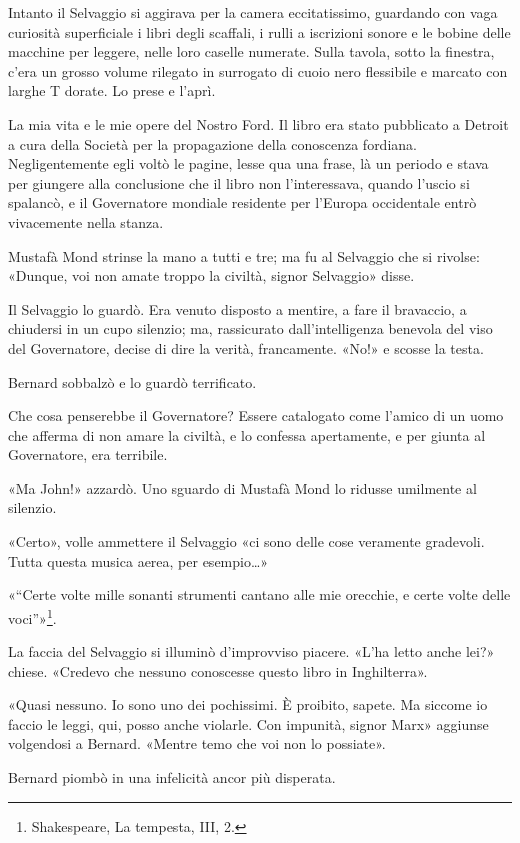 \documentclass[
a5paper, %
10pt, %
twoside, 
onecolumn, %
openany, %
]{memoir}
\begin{document}
Intanto il Selvaggio si aggirava per la camera eccitatissimo, guardando con vaga curiosità superficiale i libri degli scaffali, i rulli a iscrizioni sonore e le bobine delle macchine per leggere, nelle loro caselle numerate. Sulla tavola, sotto la finestra, c’era un grosso volume rilegato in surrogato di cuoio nero flessibile e marcato con larghe T dorate. Lo prese e l’aprì.

La mia vita e le mie opere del Nostro Ford. Il libro era stato pubblicato a Detroit a cura della Società per la propagazione della conoscenza fordiana. Negligentemente egli voltò le pagine, lesse qua una frase, là un periodo e stava per giungere alla conclusione che il libro non l’interessava, quando l’uscio si spalancò, e il Governatore mondiale residente per l’Europa occidentale entrò vivacemente nella stanza.

Mustafà Mond strinse la mano a tutti e tre; ma fu al Selvaggio che si rivolse: «Dunque, voi non amate troppo la civiltà, signor Selvaggio» disse.

Il Selvaggio lo guardò. Era venuto disposto a mentire, a fare il bravaccio, a chiudersi in un cupo silenzio; ma, rassicurato dall’intelligenza benevola del viso del Governatore, decise di dire la verità, francamente. «No!» e scosse la testa.

Bernard sobbalzò e lo guardò terrificato.

Che cosa penserebbe il Governatore? Essere catalogato come l’amico di un uomo che afferma di non amare la civiltà, e lo confessa apertamente, e per giunta al Governatore, era terribile.

«Ma John!» azzardò. Uno sguardo di Mustafà Mond lo ridusse umilmente al silenzio.

«Certo», volle ammettere il Selvaggio «ci sono delle cose veramente gradevoli. Tutta questa musica aerea, per esempio…»

«“Certe volte mille sonanti strumenti cantano alle mie orecchie, e certe volte delle voci”»\footnote{Shakespeare, La tempesta, III, 2.}.

La faccia del Selvaggio si illuminò d’improvviso piacere. «L’ha letto anche lei?» chiese. «Credevo che nessuno conoscesse questo libro in Inghilterra».

«Quasi nessuno. Io sono uno dei pochissimi. È proibito, sapete. Ma siccome io faccio le leggi, qui, posso anche violarle. Con impunità, signor Marx» aggiunse volgendosi a Bernard. «Mentre temo che voi non lo possiate».

Bernard piombò in una infelicità ancor più disperata.
\end{document}
